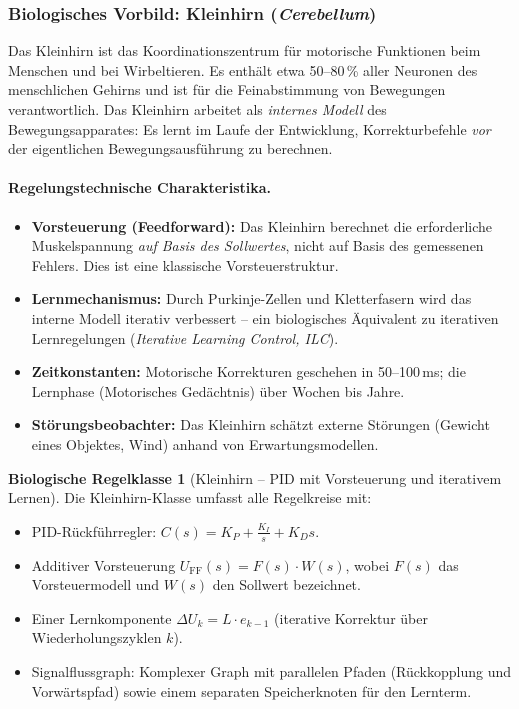 \documentclass[a4paper,12pt]{article}
\theoremstyle{definition}
\newtheorem{klasse}{Biologische Regelklasse}
\begin{document}
\subsubsection{Biologisches Vorbild: Kleinhirn (\textit{Cerebellum})}

Das Kleinhirn ist das Koordinationszentrum für motorische Funktionen beim
Menschen und bei Wirbeltieren. Es enthält etwa 50--80\,\% aller Neuronen des
menschlichen Gehirns und ist für die Feinabstimmung von Bewegungen
verantwortlich. Das Kleinhirn arbeitet als \emph{internes Modell} des
Bewegungsapparates: Es lernt im Laufe der Entwicklung, Korrekturbefehle
\emph{vor} der eigentlichen Bewegungsausführung zu berechnen.

\paragraph{Regelungstechnische Charakteristika.}
\begin{itemize}
	\item \textbf{Vorsteuerung (Feedforward):} Das Kleinhirn berechnet die
	erforderliche Muskelspannung \emph{auf Basis des Sollwertes}, nicht
	auf Basis des gemessenen Fehlers. Dies ist eine klassische
	Vorsteuerstruktur.
	\item \textbf{Lernmechanismus:} Durch Purkinje-Zellen und Kletterfasern
	wird das interne Modell iterativ verbessert -- ein biologisches
	Äquivalent zu iterativen Lernregelungen (\emph{Iterative Learning
		Control, ILC}).
	\item \textbf{Zeitkonstanten:} Motorische Korrekturen geschehen in
	50--100\,ms; die Lernphase (Motorisches Gedächtnis) über Wochen bis Jahre.
	\item \textbf{Störungsbeobachter:} Das Kleinhirn schätzt externe Störungen
	(Gewicht eines Objektes, Wind) anhand von Erwartungsmodellen.
\end{itemize}

\begin{klasse}[Kleinhirn -- PID mit Vorsteuerung und iterativem Lernen]
	\label{kl:kleinhirn}
	Die Kleinhirn-Klasse umfasst alle Regelkreise mit:
	\begin{itemize}
		\item PID-Rückführregler: $C(s) = K_P + \frac{K_I}{s} + K_D s$.
		\item Additiver Vorsteuerung $U_{\mathrm{FF}}(s) = F(s) \cdot W(s)$,
		wobei $F(s)$ das Vorsteuermodell und $W(s)$ den Sollwert bezeichnet.
		\item Einer Lernkomponente $\Delta U_k = L \cdot e_{k-1}$ (iterative
		Korrektur über Wiederholungszyklen $k$).
		\item Signalflussgraph: Komplexer Graph mit parallelen Pfaden (Rückkopplung
		und Vorwärtspfad) sowie einem separaten Speicherknoten für den
		Lernterm.
	\end{itemize}
\end{klasse}
\end{document}
